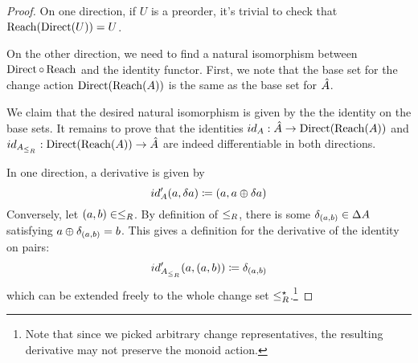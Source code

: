 \preordEquivalence*
\begin{proof}
  \label{prf:preordEquivalence}
  On one direction, if $U$ is a preorder, it's trivial to check that $\operatorname{Reach} (\operatorname{Direct} (U)) = U$.

  On the other direction, we need to find a natural isomorphism between $\operatorname{Direct} \circ \operatorname{Reach}$
  and the identity functor. First, we note that the base set for the change action
  $\operatorname{Direct}(\operatorname{Reach}(A))$ is the same as the base set for $\hat{A}$.

  We claim that the desired natural isomorphism is given by the
  the identity on the base sets. It remains to prove that the identities
  $id_A : \hat{A} \rightarrow \operatorname{Direct}(\operatorname{Reach}(A))$ and
  $id_{A_{\leq_R}} : \operatorname{Direct}(\operatorname{Reach}(A)) \rightarrow \hat{A}$
  are indeed differentiable in both directions.

  In one direction, a derivative is given by
  \begin{displaymath}
    id'_A(a, \delta a) \coloneqq (a, a \oplus \delta a)
  \end{displaymath}
  Conversely, let $(a, b) \in \leq_R$. By definition of $\leq_R$, there is some
  $\delta_{(a, b)} \in \Delta A$ satisfying $a \oplus \delta_{(a,b)} = b$.
  This gives a definition for the derivative of the identity on pairs:
  \begin{displaymath}
    id'_{A_{\leq_R}}(a, (a, b)) \coloneqq \delta_{(a, b)}
  \end{displaymath}
  which can be extended freely to the whole change set
  $\leq_R^\star$.\footnote{Note that since we picked arbitrary change
    representatives, the resulting derivative may not preserve the monoid action.}
\end{proof}

